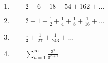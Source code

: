 \begin{enumerate}

\item \(\qquad 2+6+18+54+162+\ldots\) \vfill
\item \(\qquad2+1+\frac{1}{2}+\frac{1}{4}+\frac{1}{8}+\frac{1}{16}+\ldots\) \vfill

\item \(\qquad\frac{1}{3}+\frac{1}{27}+\frac{1}{243}+\ldots\)\vfill
\item \(\qquad\sum_{n=1}^\infty	\frac{3^n}{\pi^{n+1}}\)\vfill

\end{enumerate}
%
%
%
%
%
%
%
%
%
%
%


